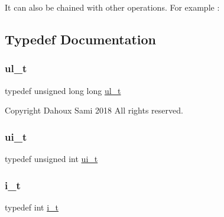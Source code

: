 \begin{DoxyCode}{0}
\end{DoxyCode}


It can also be chained with other operations. For example \+:


\begin{DoxyCode}{0}
\end{DoxyCode}
 

\subsection{Typedef Documentation}
\mbox{\label{group___n_algebra_ga1b140a2034db3f5dfe18a987745df43a}} 
\subsubsection{\texorpdfstring{ul\_t}{ul\_t}}
{\footnotesize\ttfamily typedef unsigned long long \mbox{\hyperlink{group___n_algebra_ga1b140a2034db3f5dfe18a987745df43a}{ul\+\_\+t}}}

\begin{DoxyCopyright}{Copyright}
Dahoux Sami 2018 All rights reserved. 
\end{DoxyCopyright}
\mbox{\label{group___n_algebra_gaf725d9f5d457c0cbd02e1778cb2294a8}} 
\subsubsection{\texorpdfstring{ui\_t}{ui\_t}}
{\footnotesize\ttfamily typedef unsigned int \mbox{\hyperlink{group___n_algebra_gaf725d9f5d457c0cbd02e1778cb2294a8}{ui\+\_\+t}}}

\mbox{\label{group___n_algebra_ga72a56cddd77907733a7766bd5e332f53}} 
\subsubsection{\texorpdfstring{i\_t}{i\_t}}
{\footnotesize\ttfamily typedef int \mbox{\hyperlink{group___n_algebra_ga72a56cddd77907733a7766bd5e332f53}{i\+\_\+t}}}

